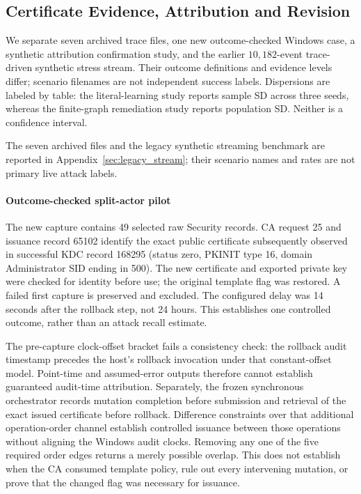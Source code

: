 \subsection{Certificate Evidence, Attribution and Revision}
We separate seven archived trace files, one new outcome-checked Windows case, a synthetic attribution confirmation study, and the earlier $10,182$-event trace-driven synthetic stress stream. Their outcome definitions and evidence levels differ; scenario filenames are not independent success labels. Dispersions are labeled by table: the literal-learning study reports sample SD across three seeds, whereas the finite-graph remediation study reports population SD. Neither is a confidence interval.

The seven archived files and the legacy synthetic streaming benchmark are reported in Appendix~\ref{sec:legacy_stream}; their scenario names and rates are not primary live attack labels.

\paragraph{Outcome-checked split-actor pilot}
The new capture contains 49 selected raw Security records. CA request 25 and issuance record 65102 identify the exact public certificate subsequently observed in successful KDC record 168295 (status zero, PKINIT type 16, domain Administrator SID ending in 500). The new certificate and exported private key were checked for identity before use; the original template flag was restored. A failed first capture is preserved and excluded. The configured delay was 14 seconds after the rollback step, not 24 hours. This establishes one controlled outcome, rather than an attack recall estimate.

The pre-capture clock-offset bracket fails a consistency check: the rollback audit timestamp precedes the host's rollback invocation under that constant-offset model. Point-time and assumed-error outputs therefore cannot establish guaranteed audit-time attribution. Separately, the frozen synchronous orchestrator records mutation completion before submission and retrieval of the exact issued certificate before rollback. Difference constraints over that additional operation-order channel establish controlled issuance between those operations without aligning the Windows audit clocks. Removing any one of the five required order edges returns a merely possible overlap. This does not establish when the CA consumed template policy, rule out every intervening mutation, or prove that the changed flag was necessary for issuance.


